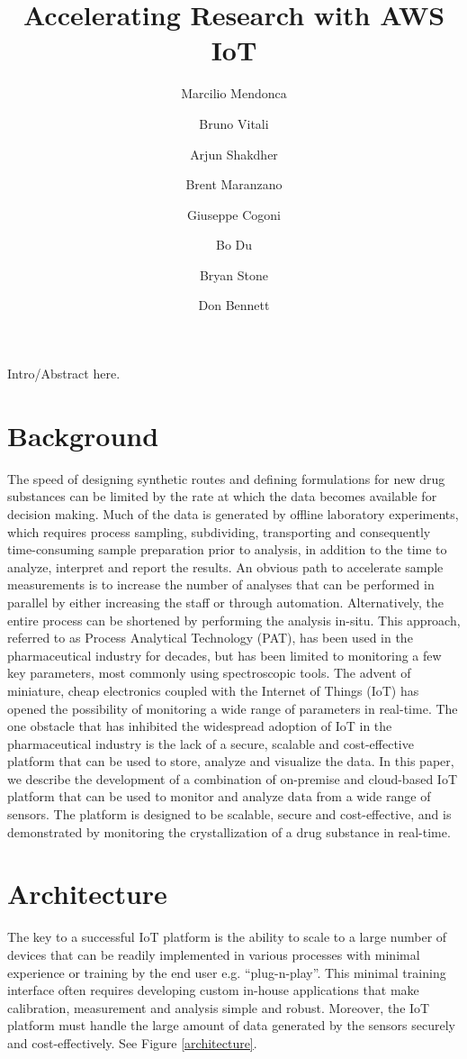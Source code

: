 \documentclass[10pt]{article}
\title{Accelerating Research with AWS IoT}
\author[1]{Marcilio Mendonca}
\author[1]{Bruno Vitali}
\author[1]{Arjun Shakdher}
\author[2]{Brent Maranzano}
\author[2]{Giuseppe Cogoni}
\author[2]{Bo Du}
\author[1]{Bryan Stone}
\author[1]{Don Bennett}
\affil[1]{AWS}
\affil[2]{Pfizer, Inc.}
\date{} %
\begin{document}
\maketitle

\section*{}
Intro/Abstract here.


\section*{Background}
The speed of designing synthetic routes and defining 
formulations for new drug substances can be limited by the
rate at which the data becomes available for decision making. 
Much of the data is generated by offline laboratory
experiments, which requires process sampling, subdividing, 
transporting and consequently time-consuming sample 
preparation prior to analysis, in addition to the time
to analyze, interpret and report the results. An obvious
path to accelerate sample measurements is to increase the
number of analyses that can be performed in parallel by
either increasing the staff or through automation.
Alternatively, the entire process can be shortened by performing
the analysis in-situ. This approach, referred to as 
Process Analytical Technology (PAT), has been used in the
pharmaceutical industry for decades, but has been limited
to monitoring a few key parameters, most commonly using spectroscopic tools. 
The advent of miniature, cheap electronics coupled 
with the Internet of Things (IoT) has opened the possibility of 
monitoring a wide range of parameters in real-time.
The one obstacle that has inhibited the widespread adoption
of IoT in the pharmaceutical industry is the lack of a secure, 
scalable and cost-effective platform that can be used to store, 
analyze and visualize the data. In this paper, we describe the development of a
combination of on-premise and cloud-based IoT platform
that can be used to monitor and analyze data from a wide
range of sensors. The platform is designed to be scalable,
secure and cost-effective, and is demonstrated 
by monitoring the crystallization of a drug substance in real-time.

\section*{Architecture}
The key to a successful IoT platform is the ability to
scale to a large number of devices that can be readily implemented 
in various processes with minimal experience or training
by the end user e.g. “plug-n-play”. 
This minimal training interface often requires developing custom
in-house applications that make calibration, measurement
and analysis simple and robust. Moreover, the IoT platform 
must handle the large amount of data generated by
the sensors securely and cost-effectively. See Figure \ref{architecture}.
\end{document}
